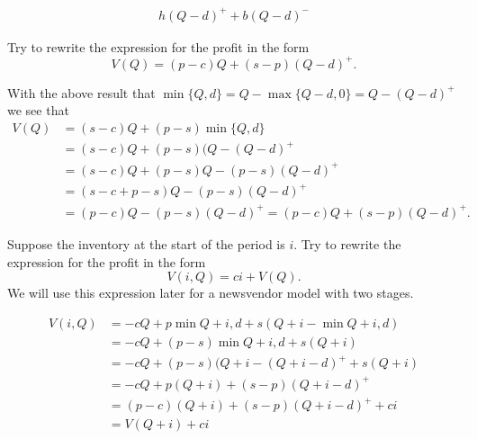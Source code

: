 \begin{solution}
\begin{align*}
h(Q-d)^+ + b(Q-d)^-
\end{align*}
\end{solution}

\begin{question}
Try  to rewrite the  expression for the profit in the form
\begin{equation}\label{eq:1}
V(Q) = (p -c)Q  + (s-p)(Q-d)^+.
\end{equation}
\end{question}

\begin{solution}
With the above  result that $\min\{Q,d\} = Q-\max\{Q-d,0\} = Q - (Q-d)^+$ we see that
\begin{equation*}
  \begin{split}
V(Q) 
&= (s-c)Q + (p-s) \min\{Q,d\}\\
&= (s-c)Q + (p-s) (Q- (Q-d)^+\\
&= (s-c)Q +  (p-s) Q - (p-s)(Q-d)^+\\
&= (s-c + p -s)Q  - (p-s)(Q-d)^+\\
&= (p -c)Q  - (p-s)(Q-d)^+ = (p -c)Q  + (s-p)(Q-d)^+.
  \end{split}
\end{equation*}
\end{solution}

\begin{question}
Suppose the inventory at the start of the period is $i$. Try  to rewrite the  expression for the profit in the form
\begin{equation}\label{eq:2}
V(i, Q) = ci + V(Q).
\end{equation}
We will use this expression later for a newsvendor model with two stages.
\end{question}
\begin{solution}
\begin{equation*}
  \begin{split}
V(i, Q) 
&= -cQ + p\min{Q+i, d} + s(Q+i-\min{Q+i,d})\\
&= - cQ + (p-s)\min{Q+i, d} + s(Q+i)\\
&= - cQ + (p-s)(Q+i-(Q+i-d)^+ + s(Q+i)\\
&= - cQ + p(Q+i)+(s-p)(Q+i-d)^+ \\
&= (p- c)(Q+i) +(s-p)(Q+i-d)^+ + ci\\
&= V(Q+i) + ci\\
  \end{split}
\end{equation*}
\end{solution}


